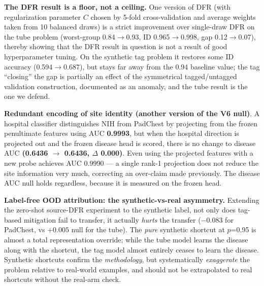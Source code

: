 \documentclass{ieeeaccess}
\begin{document}
\textbf{The DFR result is a floor, not a ceiling.} One version of DFR (with regularization parameter $C$ chosen by 5-fold cross-validation and average weights taken from 10 balanced draws) is a strict improvement over single-draw DFR on the tube problem (worst-group 0.84$\rightarrow$0.93, ID 0.965$\rightarrow$0.998, gap 0.12$\rightarrow$0.07), thereby showing that the DFR result in question is not a result of good hyperparameter tuning. On the synthetic tag problem it restores some ID accuracy (0.594$\rightarrow$0.687), but stays far away from the 0.94 baseline value; the tag ``closing'' the gap is partially an effect of the symmetrical tagged/untagged validation construction, documented as an anomaly, and the tube result is the one we defend.

\textbf{Redundant encoding of site identity (another version of the V6 null)}. A hospital classifier distinguishes NIH from PadChest by projecting from the frozen penultimate features using AUC \textbf{0.9993}, but when the hospital direction is projected out and the frozen disease head is scored, there is no change to disease AUC \textbf{(0.6436 $\rightarrow$ 0.6436, $\Delta$ 0.000)}. Even using the projected features with a new probe achieves AUC 0.9990 --- a single rank-1 projection does not reduce the site information very much, correcting an over-claim made previously. The disease AUC null holds regardless, because it is measured on the frozen head.

\textbf{Label-free OOD attribution: the synthetic-vs-real asymmetry.} Extending the zero-shot source-DFR experiment to the synthetic label, not only does tag-based mitigation fail to transfer, it actually \emph{hurts} the transfer ($-0.083$ for PadChest, vs $+0.005$ null for the tube). The \emph{pure} synthetic shortcut at $p$=0.95 is almost a total representation override; while the tube model learns the disease along with the shortcut, the tag model almost entirely ceases to learn the disease. Synthetic shortcuts confirm the \emph{methodology}, but systematically \emph{exaggerate} the problem relative to real-world examples, and should not be extrapolated to real shortcuts without the real-arm check.
\end{document}
